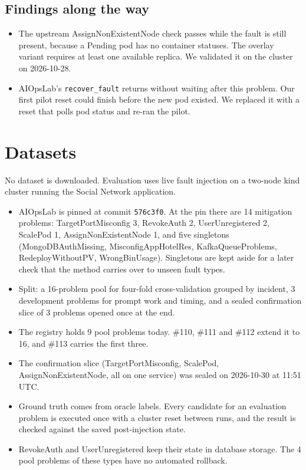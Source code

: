 \documentclass[10pt,conference]{IEEEtran}
\newcommand{\code}[1]{\texttt{#1}}
\begin{document}
\subsection{Findings along the way}

\begin{itemize}
\item The upstream AssignNonExistentNode check passes while the fault is still present,
because a Pending pod has no container statuses. The overlay variant requires at least one
available replica. We validated it on the cluster on 2026-10-28.
\item AIOpsLab's \code{recover\_fault} returns without waiting after this problem. Our
first pilot reset could finish before the new pod existed. We replaced it with a reset that
polls pod status and re-ran the pilot.
\end{itemize}

\section{Datasets}

No dataset is downloaded. Evaluation uses live fault injection on a two-node kind cluster
running the Social Network application.

\begin{itemize}
\item AIOpsLab is pinned at commit \code{576c3f0}. At the pin there are 14 mitigation
problems: TargetPortMisconfig 3, RevokeAuth 2, UserUnregistered 2, ScalePod 1,
AssignNonExistentNode 1, and five singletons (MongoDBAuthMissing, MisconfigAppHotelRes,
KafkaQueueProblems, RedeployWithoutPV, WrongBinUsage). Singletons are kept aside for a
later check that the method carries over to unseen fault types.
\item Split: a 16-problem pool for four-fold cross-validation grouped by incident, 3
development problems for prompt work and timing, and a sealed confirmation slice of 3
problems opened once at the end.
\item The registry holds 9 pool problems today. \#110, \#111 and \#112 extend it to 16, and
\#113 carries the first three.
\item The confirmation slice (TargetPortMisconfig, ScalePod, AssignNonExistentNode, all on
one service) was sealed on 2026-10-30 at 11:51 UTC.
\item Ground truth comes from oracle labels. Every candidate for an evaluation problem is
executed once with a cluster reset between runs, and the result is checked against the
saved post-injection state.
\item RevokeAuth and UserUnregistered keep their state in database storage. The 4 pool
problems of these types have no automated rollback.
\end{itemize}
\end{document}
